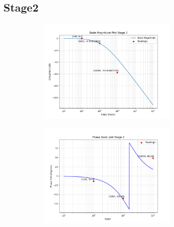 \documentclass[a4paper,12pt]{article}
\begin{document}
\subsection*{Stage2}
\begin{figure}[H]
    \centering
    \begin{subfigure}{0.5\textwidth}
        \centering
        \includegraphics[height=5cm]{figs/Stage2/Magn.png}
    \end{subfigure}%
    \begin{subfigure}{0.5\textwidth}
        \centering
        \includegraphics[height=5cm]{figs/Stage2/Phase.png}
    \end{subfigure}
\end{figure}
\end{document}
